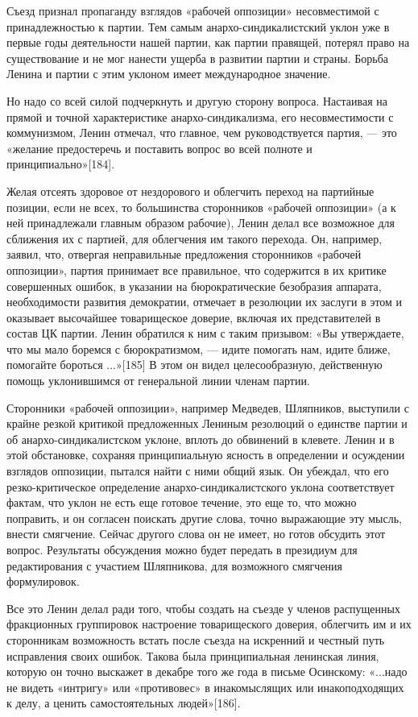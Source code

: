 \documentclass[12pt, a4paper, openany]{book}
\begin{document}
Съезд признал пропаганду взглядов «рабочей оппозиции» несовместимой с принадлежностью к партии. Тем самым анархо-синдикалистский уклон уже в первые годы деятельности нашей партии, как партии правящей, потерял право на существование и не мог нанести ущерба в развитии партии и страны. Борьба Ленина и партии с этим уклоном имеет международное значение.

Но надо со всей силой подчеркнуть и другую сторону вопроса. Настаивая на прямой и точной характеристике анархо-синдикализма, его несовместимости с коммунизмом, Ленин отмечал, что главное, чем руководствуется партия, — это «желание предостеречь и поставить вопрос во всей полноте и принципиально»[184].

Желая отсеять здоровое от нездорового и облегчить переход на партийные позиции, если не всех, то большинства сторонников «рабочей оппозиции» (а к ней принадлежали главным образом рабочие), Ленин делал все возможное для сближения их с партией, для облегчения им такого перехода. Он, например, заявил, что, отвергая неправильные предложения сторонников «рабочей оппозиции», партия принимает все правильное, что содержится в их критике совершенных ошибок, в указании на бюрократические безобразия аппарата, необходимости развития демократии, отмечает в резолюции их заслуги в этом и оказывает высочайшее товарищеское доверие, включая их представителей в состав ЦК партии. Ленин обратился к ним с таким призывом: «Вы утверждаете, что мы мало боремся с бюрократизмом, — идите помогать нам, идите ближе, помогайте бороться ...»[185] В этом он видел целесообразную, действенную помощь уклонившимся от генеральной линии членам партии.

Сторонники «рабочей оппозиции», например Медведев, Шляпников, выступили с крайне резкой критикой предложенных Лениным резолюций о единстве партии и об анархо-синдикалистском уклоне, вплоть до обвинений в клевете. Ленин и в этой обстановке, сохраняя принципиальную ясность в определении и осуждении взглядов оппозиции, пытался найти с ними общий язык. Он убеждал, что его резко-критическое определение анархо-синдикалистского уклона соответствует фактам, что уклон не есть еще готовое течение, это еще то, что можно поправить, и он согласен поискать другие слова, точно выражающие эту мысль, внести смягчение. Сейчас другого слова он не имеет, но готов обсудить этот вопрос. Результаты обсуждения можно будет передать в президиум для редактирования с участием Шляпникова, для возможного смягчения формулировок.

Все это Ленин делал ради того, чтобы создать на съезде у членов распущенных фракционных группировок настроение товарищеского доверия, облегчить им и их сторонникам возможность встать после съезда на искренний и честный путь исправления своих ошибок. Такова была принципиальная ленинская линия, которую он точно выскажет в декабре того же года в письме Осинскому: «...надо не видеть «интригу» или «противовес» в инакомыслящих или инакоподходящих к делу, а ценить самостоятельных людей»[186].
\end{document}
